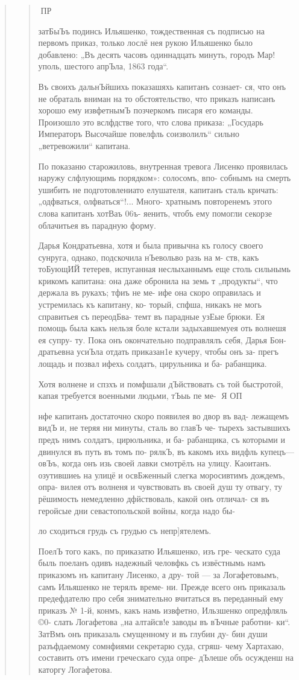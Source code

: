 \begin{quote}
\begin{quote}
ПР

затБыЪъ подинсь Ильяшенко, тождественная съ подписью на
первомъ приказ, только лослё нея рукою Ильяшенко было
добавлено: „Въ десять часовъ одиннадцать минуть, городъ
Мар!уполь, шестого апрЪла, 1863 года“.

Въ своихъ дальнЪйшихь показашяхь капитанъ сознает-
ся, что онъ не обраталь вниман на то обстоятельство,
что приказъ написанъ хорошо ему извфетнымЪ позчеркомъ
писаря его команды. Произошло это вслфдстве того, что
слова приказа: „Государь Императоръ Высочайше повелфль
соизволилъ“ сильно „ветревожили“ капитана.

По показаню старожиловь, внутренная тревога Лисенко
проявилась наружу слфлующимь порядком»: солосомъ, впо-
собнымъ на смерть ушибить не подготовлениато елушателя,
капитанъ сталь кричать: „одфваться, олфваться“!... Много-
хратнымъ повторенемъ этого слова капитанъ хотВаъ 06ъ-
яенить, чтобъ ему помогли секорзе облачитьея въ парадную
форму.

Дарья Кондратьевна, хотя и была привычна къ голосу
своего сунруга, однако, подскочила нЪевольво разь на м-
ств, какъ тоБующИЙ тетерев, испуганная неслыханнымъ еще
столь сильнымь крикомъ капитана: она даже обронила на
земь т „продукты“, что держала въ рукахъ; тфиъ не ме-
ифе она скоро оправилась и устремилась къ капитану, ко-
торый, спфша, никакъ не могь справитьея съ переодБва-
темт въ парадные узЕые брюки. Ея помощь была какъ
нельзя боле кстали задыхавшемуея оть волнешя ея супру-
ту. Пока онъ окончательно подправлялъ себя, Дарья Бон-
дратьевна усиЪла отдать приказан1е кучеру, чтобы онъ за-
прегъ лощадь и позвал ифехь солдатъ, цирульника и ба-
рабанщика.

Хотя волнене и спзхъ и помфшали дЪйствовать съ той
быстротой, капая требуется военными людьми, тЪыь пе ме-
Я ОП

нфе капитанъ достаточно скоро появилея во двор въ вад-
лежащемъ видЪ и, не теряя ни минуты, сталь во главЪ че-
тырехъ застывшихъ предъ нимъ солдатъ, цирюльника, и ба-
рабанщика, съ которыми и двинулся въ путь въ томъ по-
рялкЪ, въ какомъ ихь видфль купецъ—овЪъ, когда онъ изь
своей лавки смотрёлъ на улицу. Каоитанъ. озутившиеь на
улицё и освБженный слегка моросивтимъ дождемъ, опра-
вилея отъ волненя и чувствовать въ своей душ ту отвагу,
ту рёшимость немедленно дфйствоваль, какой онъ отличал-
ся въ геройсые дни севастопольской войны, когда надо бы-

ло сходиться грудь съ грудью съ непр]ятелемъ.

ПоелЪ того какъ, по приказатю Ильяшенко, изъ гре-
ческато суда быль поеланъ одивъ надежный человфкь съ
извёстнымь намъ приказомъ нъ капитану Лисенко, а дру-
той — за Логафетовымъ, самъ Ильяшенко не терялъ време-
ни. Прежде всего онъ приказаль предефдателю про себя
знимательно вчитаться въ переданный ему приказъ № 1-й,
конмъ, какъ намь извфетно, Ильзшенко опредфляль ©0-
слать Логафетова „на алтайсв!е заводы въ вЪчные работни-
ки“. ЗатВмъ онъ приказаль смущенному и въ глубин ду-
бин души разъфдаемому сомнфиями секретарю суда, сгряш-
чему Хартахаю, составить отъ имени греческаго суда опре-
дЪлеше объ осужденш на каторгу Логафетова.


\end{quote}
\end{quote}
